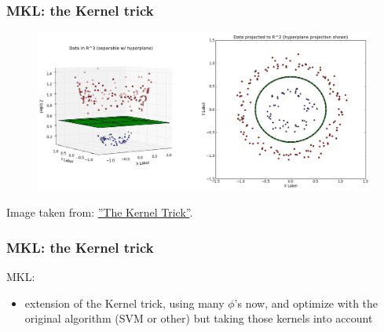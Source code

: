\documentclass{beamer}
\begin{document}
\begin{frame}
\frametitle{MKL: the Kernel trick}

\begin{figure}
\includegraphics[width=1\linewidth]{data_2d_to_3d_hyperplane}
\end{figure}
Image taken from: \hyperref[http://www.eric-kim.net/eric-kim-net/posts/1/kernel_trick.html]{''The Kernel Trick''}.

\end{frame}



\begin{frame}
\frametitle{MKL: the Kernel trick}

MKL:

\begin{itemize}
\item extension of the Kernel trick, using many $\phi$'s now, and optimize with the original algorithm (SVM or other) but taking those kernels into account
\end{itemize}

\end{frame}




\end{document}

